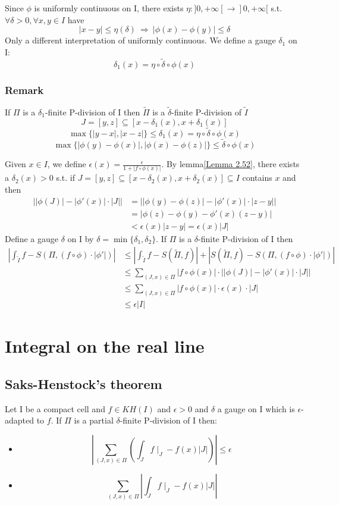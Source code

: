 \documentclass{book}
\newcommand{\abs}[1]{\left\lvert #1 \right\rvert}
\newcommand{\leftbracket}{[}
\newcommand{\rightbracket}{]}
\begin{document}
Since $\phi$ is uniformly continuous on I, there exists $\eta:\rightbracket0,+\infty\leftbracket\rightarrow\rightbracket0,+\infty\leftbracket$ s.t. $\forall\delta>0,\forall x,y\in I$ have $$\abs{x-y}\leq\eta(\delta)\ \Rightarrow\ \abs{\phi(x)-\phi(y)}\leq\delta$$
Only a different interpretation of uniformly continuous. We define a gauge $\delta_1$ on I:
$$\delta_1(x)=\eta\circ\tilde\delta\circ\phi(x)$$
\subsection*{Remark}
If $\Pi$ is a $\delta_1$-finite P-division of I then $\tilde\Pi$ is a $\tilde\delta$-finite P-division of $\tilde I$
$$J=[y,z]\subseteq[x-\delta_1(x),x+\delta_1(x)]$$
$$\max\{\abs{y-x},\abs{x-z}\}\leq \delta_1(x)=\eta\circ\tilde\delta\circ\phi(x)$$
$$\max\{\abs{\phi(y)-\phi(x)},\abs{\phi(x)-\phi(z)}\}\leq\tilde\delta\circ\phi(x)$$

Given $x\in I$, we define $\epsilon(x)=\frac{\epsilon}{1+\abs{f\circ\phi(x)}}$. By lemma\ref{Lemma 2.52}, there exists a $\delta_2(x)>0$ s.t. if $J=[y,z]\subseteq[x-\delta_2(x),x+\delta_2(x)]\subseteq I$ contains $x$ and then 
$$\begin{aligned}
    \abs{\abs{\phi(J)}-\abs{\phi'(x)}\cdot\abs J} &= \abs{\abs{\phi(y)-\phi(z)}-\abs{\phi'(x)}\cdot\abs{z-y}}\\
    &=\abs{\phi(z)-\phi(y)-\phi'(x)(z-y)}\\
    &<\epsilon(x)\abs{z-y}=\epsilon(x)\abs J
\end{aligned} $$
Define a gauge $\delta$ on I by $\delta=\min\{\delta_1,\delta_2\}$. If $\Pi $ is a $\delta$-finite P-division of I then 
$$\begin{aligned}
    \abs{\int_{\tilde I}f-S(\Pi,(f\circ\phi)\cdot\abs{\phi'})}&\leq\abs{\int_{\tilde I}f-S(\tilde\Pi,f)}+\abs{S(\tilde\Pi,f)-S(\Pi,(f\circ\phi)\cdot\abs{\phi'})}\\
    &\leq\sum\limits_{(J,x)\in \Pi}\abs{f\circ\phi(x)}\cdot\abs{\abs{\phi(J)}-\abs{\phi'(x)}\cdot\abs J}\\
    &\leq\sum\limits_{(J,x)\in \Pi}\abs{f\circ\phi(x)}\cdot\epsilon(x)\cdot\abs{J}\\
    &\leq \epsilon\abs I
\end{aligned}$$
\chapter{Integral on the real line}
\section{Saks-Henstock's theorem}
Let I be a compact cell and $f\in KH(I)$ and $\epsilon>0$ and $\delta$ a gauge on I which is $\epsilon$-adapted to $f$. If $\Pi$ is a partial $\delta$-finite P-division of I then:
\begin{itemize}
    \item $$\abs{\sum\limits_{(J,x)\in \Pi}\left(\int_Jf\mid_J-f(x)\abs J\right)}\leq\epsilon$$
    \item $$\sum\limits_{(J,x)\in \Pi}\abs{\int_Jf\mid_J-f(x)\abs J}$$
\end{itemize}
\end{document}
